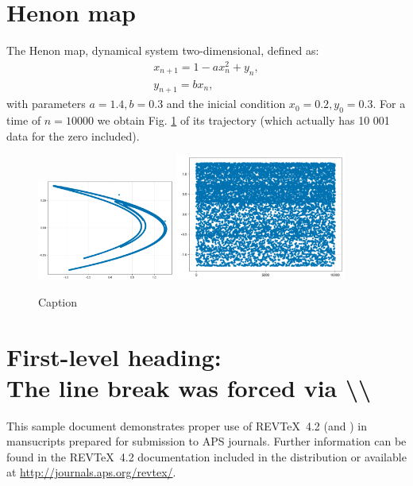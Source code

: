 \documentclass[%
 reprint,
 amsmath,amssymb,
 aps,
]{revtex4-2}
\begin{document}
\section{Henon map}
The Henon map, dynamical system two-dimensional, defined as:
\begin{equation}
    \begin{aligned}
        x_{n+1} = 1 - a x_{n}^{2} + y_{n},\\
        y_{n+1} = b x_{n},
    \end{aligned}
\end{equation}
with parameters $a=1.4,b=0.3$ and the inicial condition $x_0 = 0.2, y_0 = 0.3$. For a time of $n=10 000$ we obtain Fig. \ref{Henon_fig_1} of its trajectory (which actually has 10 001 data for the zero included).
\begin{figure}[h!]
    \centering
    \includegraphics[width=0.4\textwidth]{Henon/Screenshot_1.png}
    \includegraphics[width=0.5\textwidth]{Henon/Screenshot_2.png}
    \caption{Caption}
    \label{Henon_fig_1}
\end{figure}

\section{\label{sec:level1}First-level heading:\protect\\ The line
break was forced \lowercase{via} \textbackslash\textbackslash}

This sample document demonstrates proper use of REV\TeX~4.2 (and
\LaTeXe) in mansucripts prepared for submission to APS
journals. Further information can be found in the REV\TeX~4.2
documentation included in the distribution or available at
\url{http://journals.aps.org/revtex/}.
\end{document}
